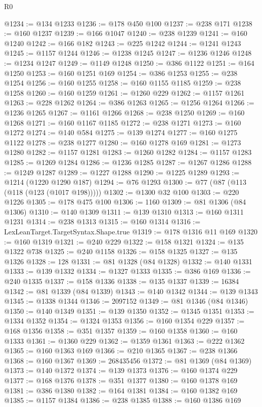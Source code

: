 \begin{lexlean}{R0}
\begin{coremodule}
@1234 := @134 @1233
@1236 := @178 @450 @100
@1237 := @238 @171
@1238 := @160 @1237
@1239 := @166 @1047
@1240 := @238 @1239
@1241 := @160 @1240
@1242 := @166 @182
@1243 := @225 @1242
@1244 := @1241 @1243
@1245 := @1157 @1244
@1246 := @1238 @1245
@1247 := @1236 @1246
@1248 := @1234 @1247
@1249 := @1149 @1248
@1250 := @386 @1122
@1251 := @164 @1250
@1253 := @160 @1251 @169
@1254 := @386 @1253
@1255 := @238 @1254
@1256 := @160 @1255
@1258 := @160 @1155 @1185
@1259 := @238 @1258
@1260 := @160 @1259
@1261 := @1260 @229
@1262 := @1157 @1261
@1263 := @228 @1262
@1264 := @386 @1263
@1265 := @1256 @1264
@1266 := @1236 @1265
@1267 := @1161 @1266
@1268 := @238 @1250
@1269 := @160 @1268
@1271 := @160 @1167 @1185
@1272 := @238 @1271
@1273 := @160 @1272
@1274 := @140 @584
@1275 := @139 @1274
@1277 := @160 @1275 @1122
@1278 := @238 @1277
@1280 := @160 @1278 @169
@1281 := @1273 @1280
@1282 := @1157 @1281
@1283 := @1260 @1282
@1284 := @1157 @1283
@1285 := @1269 @1284
@1286 := @1236 @1285
@1287 := @1267 @1286
@1288 := @1249 @1287
@1289 := @1227 @1288
@1290 := @1225 @1289
@1293 := @1214 (@1220 @1290 @187)
@1294 := @76 @1293
@1300 := @77 (@87 (@113 (@118 (@123 (@1017 @198)))))
@1302 := @1300 @32 @100
@1303 := @220 @1226
@1305 := @178 @475 @100
@1306 := 1160
@1309 := @81 @1306 (@84 @1306)
@1310 := @140 @1309
@1311 := @139 @1310
@1313 := @160 @1311 @1231
@1314 := @238 @1313
@1315 := @160 @1314
@1316 := LexLeanTarget.TargetSyntax.Shape.true
@1319 := @178 @1316 @11 @169
@1320 := @160 @1319
@1321 := @240 @229
@1322 := @158 @1321
@1324 := @135 @1322 @738
@1325 := @240 @1158
@1326 := @158 @1325
@1327 := @135 @1326
@1328 := 128
@1331 := @81 @1328 (@84 @1328)
@1332 := @140 @1331
@1333 := @139 @1332
@1334 := @1327 @1333
@1335 := @386 @169
@1336 := @240 @1335
@1337 := @158 @1336
@1338 := @135 @1337
@1339 := 16384
@1342 := @81 @1339 (@84 @1339)
@1343 := @140 @1342
@1344 := @139 @1343
@1345 := @1338 @1344
@1346 := 2097152
@1349 := @81 @1346 (@84 @1346)
@1350 := @140 @1349
@1351 := @139 @1350
@1352 := @1345 @1351
@1353 := @1334 @1352
@1354 := @1324 @1353
@1356 := @160 @1354 @229
@1357 := @168 @1356
@1358 := @351 @1357
@1359 := @160 @1358
@1360 := @160 @1333
@1361 := @1360 @229
@1362 := @1359 @1361
@1363 := @222 @1362
@1365 := @160 @1363 @169
@1366 := @210 @1365
@1367 := @238 @1366
@1368 := @160 @1367
@1369 := 268435456
@1372 := @81 @1369 (@84 @1369)
@1373 := @140 @1372
@1374 := @139 @1373
@1376 := @160 @1374 @229
@1377 := @168 @1376
@1378 := @351 @1377
@1380 := @160 @1378 @169
@1381 := @386 @1380
@1382 := @164 @1381
@1384 := @160 @1382 @169
@1385 := @1157 @1384
@1386 := @238 @1385
@1388 := @160 @1386 @169

\end{coremodule}
\end{lexlean}
